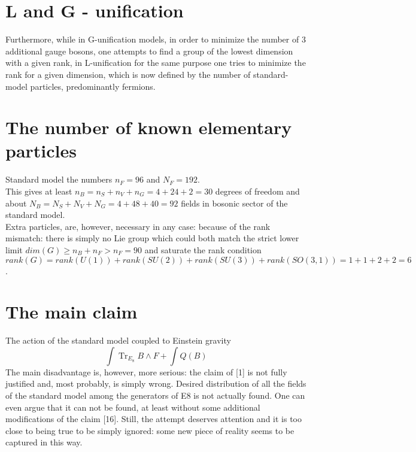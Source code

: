 \documentclass{article}
\DeclareMathOperator{\Tr}{Tr}
\begin{document}
\section{L and G - unification}
Furthermore, while in G-unification models, in order to minimize the number of 3 additional gauge bosons, one attempts to find a group of the lowest dimension with a given rank, in L-unification for the same purpose one tries to minimize the rank for a given dimension, which is now defined by the number of standard-model particles, predominantly fermions. \\

\section{The number of known elementary particles}
Standard model the numbers $n_F = 96$ and $N_F = 192$. \\
This gives at least $n_B = n_S + n_V + n_G = 4 + 24 + 2 = 30$ degrees of freedom and about $N_B = N_S + N_V + N_G = 4 + 48 + 40 = 92$ fields in bosonic sector of the standard model. \\
Extra particles, are, however, necessary in any case: because of the rank mismatch: there is simply no Lie group which could both match the strict lower limit $ dim(G) \geq n_B + n_F > n_F = 90$ and saturate the rank condition $rank(G) = rank(U (1)) + rank(SU (2)) + rank(SU (3)) + rank(SO(3, 1)) = 1 + 1 + 2 + 2 = 6$.

\section{The main claim}
The action of the standard model coupled to Einstein gravity \\
\begin{equation}
    \int \Tr_{E_8} B \land F + \int Q(B)
\end{equation}
The main disadvantage is, however, more serious: the claim of [1] is not fully justified and, most probably, is simply wrong. Desired distribution of all the fields of the standard model among the generators of E8 is not actually found. One can even argue that it can not be found, at least without some additional modifications of the claim [16]. Still, the attempt deserves attention and it is too close to being true to be simply ignored: some new piece of reality seems to be captured in this way. \\
\end{document}
